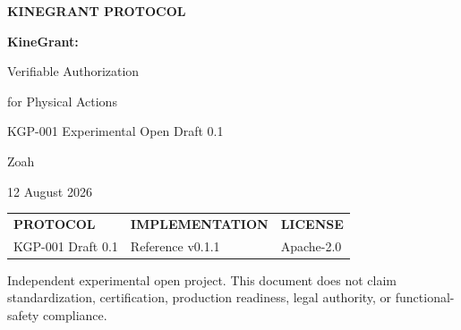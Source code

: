 \documentclass[10.5pt,a4paper]{article}
\newcommand{\statusline}[1]{\textsf{\footnotesize\bfseries #1}}
\begin{document}
\thispagestyle{empty}
\vspace*{10mm}
{\sffamily\bfseries\large KINEGRANT PROTOCOL}\par
\vspace{25mm}
{\sffamily\bfseries\fontsize{32}{35}\selectfont KineGrant:\par
Verifiable Authorization\par
for Physical Actions}\par
\vspace{8mm}
{\sffamily\Large KGP-001 Experimental Open Draft 0.1}\par
\vspace{13mm}
{\large Zoah}\par
{\small 12 August 2026}\par
\vfill
\begin{tabularx}{\linewidth}{@{}Y Y Y@{}}
\toprule
\statusline{PROTOCOL} & \statusline{IMPLEMENTATION} & \statusline{LICENSE} \\
KGP-001 Draft 0.1 & Reference v0.1.1 & Apache-2.0 \\
\bottomrule
\end{tabularx}
\vspace{7mm}
{\footnotesize\color{mid}\begin{minipage}{\linewidth}
Independent experimental open project. This document does not claim standardization,
certification, production readiness, legal authority, or functional-safety compliance.
\end{minipage}}
\newpage

\begin{abstract}
Machines controlled by software increasingly cause state changes in the physical world.
The software that decides what to do is often separated from the device that ultimately
acts, while identity systems, transport security, robot middleware, and safety controls
each protect a different boundary. This leaves a narrow but important question: what
cryptographically verifiable authorization did this actuator possess for this exact
action, at this target, at this time?

KineGrant is an experimental authorization and accountability protocol for that boundary.
It converts a policy decision into a short-lived, signed, request-bound capability; places
a fail-closed action gate in the actuator control path; consumes the capability atomically;
and binds execution to a signed terminal receipt. The protocol is transport-independent,
defaults to denial, applies deny-overrides, and prevents untrusted policy sources from
expanding authority. This paper defines the system and threat models, decision semantics,
capability construction, gate algorithm, receipt semantics, conditional security
invariants, interoperability boundaries, and a reproducible software test method.

KineGrant does not solve identity enrollment, legal ownership, safe motion, sensor truth,
key compromise, or actuator firmware compromise. A receipt proves an executor's signed
attestation, not physical truth. The draft is intended to make the authorization boundary
precise enough to implement, attack, reproduce, and revise.
\end{abstract}
\end{document}
